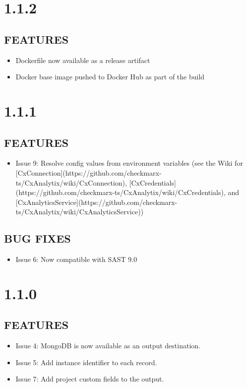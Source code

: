 \section{1.1.2}
\subsection*{FEATURES}
    \begin{itemize}
        \item Dockerfile now available as a release artifact
        \item Docker base image pushed to Docker Hub as part of the build 
    \end{itemize}

\section{1.1.1}
\subsection*{FEATURES}
    \begin{itemize}
        \item Issue 9: Resolve config values from environment variables (see the Wiki for [CxConnection](https://github.com/checkmarx-ts/CxAnalytix/wiki/CxConnection), [CxCredentials](https://github.com/checkmarx-ts/CxAnalytix/wiki/CxCredentials), and [CxAnalyticsService](https://github.com/checkmarx-ts/CxAnalytix/wiki/CxAnalyticsService))
    \end{itemize}
\subsection*{BUG FIXES}
    \begin{itemize}
        \item Issue 6: Now compatible with SAST 9.0
    \end{itemize}

\section{1.1.0}
\subsection*{FEATURES}
    \begin{itemize}
        \item Issue 4: MongoDB is now available as an output destination.
        \item Issue 5: Add instance identifier to each record.
        \item Issue 7: Add project custom fields to the output.
    \end{itemize}

